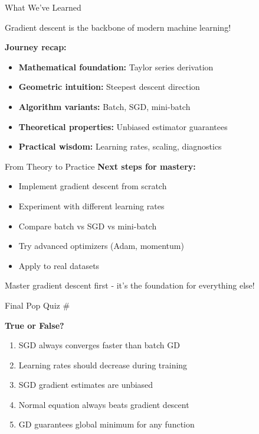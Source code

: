 \documentclass[usenames,dvipsnames]{beamer}
\begin{document}
  \begin{frame}{What We've Learned}
    \begin{keypointsbox}{}
    Gradient descent is the backbone of modern machine learning!
    \end{keypointsbox}
    
    \pause
    \textbf{Journey recap:}
    \begin{itemize}[<+->]
        \item \textbf{Mathematical foundation:} Taylor series derivation
        \item \textbf{Geometric intuition:} Steepest descent direction
        \item \textbf{Algorithm variants:} Batch, SGD, mini-batch
        \item \textbf{Theoretical properties:} Unbiased estimator guarantees
        \item \textbf{Practical wisdom:} Learning rates, scaling, diagnostics
    \end{itemize}
  \end{frame}

  \begin{frame}{From Theory to Practice}
    \textbf{Next steps for mastery:}
    \begin{itemize}[<+->]
        \item Implement gradient descent from scratch
        \item Experiment with different learning rates
        \item Compare batch vs SGD vs mini-batch
        \item Try advanced optimizers (Adam, momentum)
        \item Apply to real datasets
    \end{itemize}
    
    \pause
    \begin{keypointsbox}{}
    Master gradient descent first - it's the foundation for everything else!
    \end{keypointsbox}
  \end{frame}

  \begin{frame}{Final Pop Quiz \#\thepopquiz}
    \begin{popquizbox}{\thepopquiz}
    \textbf{True or False?}
    \begin{enumerate}
        \item SGD always converges faster than batch GD
        \item Learning rates should decrease during training  
        \item SGD gradient estimates are unbiased
        \item Normal equation always beats gradient descent
        \item GD guarantees global minimum for any function
    \end{enumerate}
    \end{popquizbox}
  \end{frame}
\end{document}
